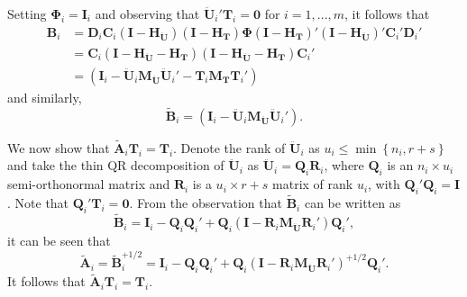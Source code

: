 \documentclass[12pt]{article}
\begin{document}
Setting \(\boldsymbol\Phi_i = \mathbf{I}_i\) and observing that
\(\mathbf{\ddot{U}}_i'\mathbf{T}_i = \mathbf{0}\) for \(i = 1,...,m\),
it follows that \begin{align}
\mathbf{B}_i &= \mathbf{D}_i \mathbf{C}_i \left(\mathbf{I} - \mathbf{H_{\ddot{U}}}\right) \left(\mathbf{I} - \mathbf{H_T}\right) \boldsymbol\Phi \left(\mathbf{I} - \mathbf{H_T}\right)' \left(\mathbf{I} - \mathbf{H_{\ddot{U}}}\right)' \mathbf{C}_i' \mathbf{D}_i' \nonumber \\ 
&= \mathbf{C}_i \left(\mathbf{I} - \mathbf{H_{\ddot{U}}} - \mathbf{H_T}\right) \left(\mathbf{I} - \mathbf{H_{\ddot{U}}} - \mathbf{H_T}\right) \mathbf{C}_i' \nonumber\\ 
\label{eq:B_i}
&= \left(\mathbf{I}_i - \mathbf{\ddot{U}}_i \mathbf{M_{\ddot{U}}}\mathbf{\ddot{U}}_i' - \mathbf{T}_i \mathbf{M_T}\mathbf{T}_i'\right)
\end{align} and similarly, \begin{equation}
\label{eq:Btilde_i}
\tilde{\mathbf{B}}_i = \left(\mathbf{I}_i - \mathbf{\ddot{U}}_i \mathbf{M_{\ddot{U}}}\mathbf{\ddot{U}}_i'\right).
\end{equation}

We now show that \(\tilde{\mathbf{A}}_i \mathbf{T}_i = \mathbf{T}_i\).
Denote the rank of \(\mathbf{\ddot{U}}_i\) as
\(u_i \leq \min \left\{n_i, r + s \right\}\) and take the thin QR
decomposition of \(\mathbf{\ddot{U}}_i\) as
\(\mathbf{\ddot{U}}_i = \mathbf{Q}_i \mathbf{R}_i\), where
\(\mathbf{Q}_i\) is an \(n_i \times u_i\) semi-orthonormal matrix and
\(\mathbf{R}_i\) is a \(u_i \times r + s\) matrix of rank \(u_i\), with
\(\mathbf{Q}_i'\mathbf{Q}_i = \mathbf{I}\). Note that
\(\mathbf{Q}_i'\mathbf{T}_i = \mathbf{0}\). From the observation that
\(\tilde{\mathbf{B}}_i\) can be written as \[
\tilde{\mathbf{B}}_i = \mathbf{I}_i - \mathbf{Q}_i \mathbf{Q}_i' + \mathbf{Q}_i \left(\mathbf{I} - \mathbf{R}_i \mathbf{M}_{\mathbf{\ddot{U}}} \mathbf{R}_i'\right)\mathbf{Q}_i',
\] it can be seen that \begin{equation}
\tilde{\mathbf{A}}_i = \tilde{\mathbf{B}}_i^{+1/2} = \mathbf{I}_i - \mathbf{Q}_i \mathbf{Q}_i' + \mathbf{Q}_i \left(\mathbf{I} - \mathbf{R}_i \mathbf{M}_{\mathbf{\ddot{U}}} \mathbf{R}_i'\right)^{+1/2} \mathbf{Q}_i'.
\end{equation} It follows that
\(\tilde{\mathbf{A}}_i \mathbf{T}_i = \mathbf{T}_i\).
\end{document}
